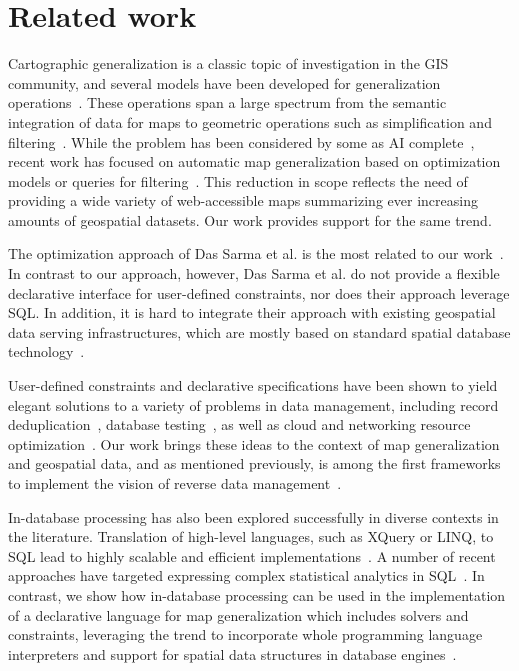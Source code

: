 \section{Related work}
\label{sec:related}

Cartographic generalization is a classic topic of investigation in the GIS community, and several models have been developed for generalization operations~\cite{brassel1988generalization,gruenreich1992atkis,shea1989cartographic}. These operations span a large spectrum from the semantic integration of data for maps to geometric operations such as simplification and filtering~\cite{foerster2008classification,shea1989cartographic}. While the problem has been considered by some as AI complete~\cite{frank1994multiscaletree}, recent work has focused on automatic map generalization based on optimization models or queries for filtering~\cite{nutanong2012multiresolution,sarma2012fusiontables}. This reduction in scope reflects the need of providing a wide variety of web-accessible maps summarizing ever increasing amounts of geospatial datasets. Our work provides support for the same trend.  

The optimization approach of Das Sarma et al. is the most related to our work~\cite{sarma2012fusiontables}. In contrast to our approach, however, Das Sarma et al. do not provide a flexible declarative interface for user-defined constraints, nor does their approach leverage SQL. 
In addition, it is hard to integrate their approach with existing geospatial data serving infrastructures, which are mostly based on standard spatial database technology~\cite{postgis}.

User-defined constraints and declarative specifications have been shown to yield elegant solutions to a variety of problems in data management, including record deduplication~\cite{ArasuRS09:Dedupalog}, database testing~\cite{BinnigKL07:ReverseQP,Binnig:2007:SymbolicQP}, as well as cloud and networking resource optimization~\cite{Liu:2012:Cologne}. Our work brings these ideas to the context of map generalization and geospatial data, and as mentioned previously, is among the first frameworks to implement the vision of reverse data management~\cite{meliou2011reverse}. 

In-database processing has also been explored successfully in diverse contexts in the literature. Translation of high-level languages, such as XQuery or LINQ, to SQL lead to highly scalable and efficient implementations~\cite{pathfinder,ferry}. A number of recent approaches have targeted expressing complex statistical analytics in SQL~\cite{Hellerstein:2012:Madlib,Ordonez2007:StatisticsUDFs}. In contrast, we show how in-database processing can be used in the implementation of a declarative language for map generalization which includes solvers and constraints, leveraging the trend to incorporate whole programming language interpreters and support for spatial data structures in database engines~\cite{Blakeley2008:DotNET}.  

